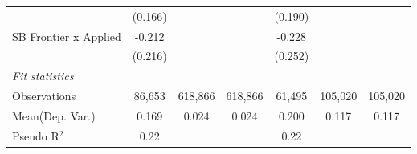 \begin{tabular}{lcccccc}
                         & (0.166)        &         &         & (0.190)       &         &   \\   
   SB Frontier x Applied & -0.212         &         &         & -0.228        &         &   \\   
                         & (0.216)        &         &         & (0.252)       &         &   \\   
   \midrule
   \emph{Fit statistics}\\
   Observations          & 86,653         & 618,866 & 618,866 & 61,495        & 105,020 & 105,020\\  
Mean(Dep. Var.) & 0.169 & 0.024 & 0.024 & 0.200 & 0.117 & 0.117 \\
   Pseudo R$^2$          & 0.22           &         &         & 0.22          &         & \\  
   

\end{tabular}
